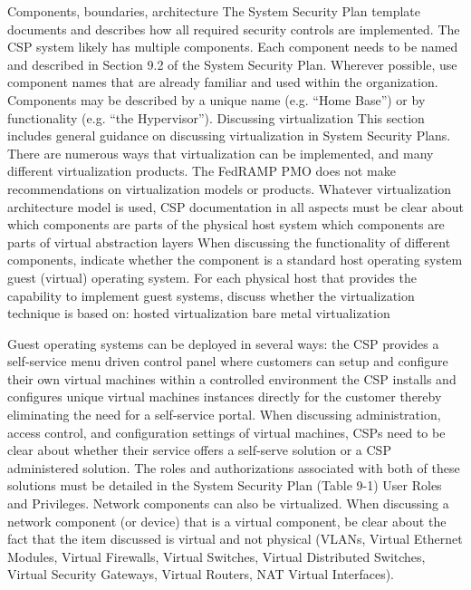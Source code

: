 \documentclass[../main.tex]{subfiles}
\begin{document}
Components, boundaries, architecture
The System Security Plan template documents and describes how all required security controls are implemented. 
The CSP system likely has multiple components. Each component needs to be named and described in Section 9.2 of the System Security Plan. Wherever possible, use component names that are already familiar and used within the organization. Components may be described by a unique name (e.g. “Home Base”) or by functionality (e.g. “the Hypervisor”).
Discussing virtualization
This section includes general guidance on discussing virtualization in System Security Plans.
There are numerous ways that virtualization can be implemented, and many different virtualization products.
The FedRAMP PMO does not make recommendations on virtualization models or products. Whatever virtualization architecture model is used, CSP documentation in all aspects must be clear about
which components are parts of the physical host system
which components are parts of virtual abstraction layers
When discussing the functionality of different components, indicate whether the component is
a standard host operating system
guest (virtual) operating system.
For each physical host that provides the capability to implement guest systems, discuss whether the virtualization technique is based on:
hosted virtualization
bare metal virtualization

Guest operating systems can be deployed in several ways:
the CSP provides a self-service menu driven control panel where customers can setup and configure their own virtual machines within a controlled environment
the CSP installs and configures unique virtual machines instances directly for the customer thereby eliminating the need for a self-service portal. 
When discussing administration, access control, and configuration settings of virtual machines, CSPs need to be clear about whether their service offers a self-serve solution or a CSP administered solution.
The roles and authorizations associated with both of these solutions must be detailed in the System Security Plan (Table 9-1) User Roles and Privileges.
Network components can also be virtualized. When discussing a network component (or device) that is a virtual component, be clear about the fact that the item discussed is virtual and not physical (VLANs, Virtual Ethernet Modules, Virtual Firewalls, Virtual Switches, Virtual Distributed Switches, Virtual Security Gateways, Virtual Routers, NAT Virtual Interfaces).
\end{document}
